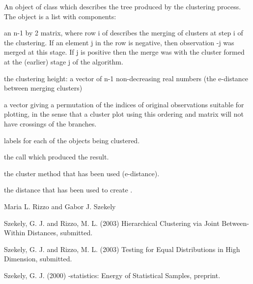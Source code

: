 \begin{Value}
An object of class  which describes the tree produced by
the clustering process. The object is a list with components: 
\begin{ldescription}
\item[\code{merge:}] an n-1 by 2 matrix, where row i of  describes the
merging of clusters at step i of the clustering. If an element j in the
row is negative, then observation -j was merged at this
stage. If j is positive then the merge was with the cluster
formed at the (earlier) stage j of the algorithm.
\item[\code{height:}] the clustering height: a vector of n-1 non-decreasing
real numbers (the e-distance between merging clusters)
\item[\code{order:}] a vector giving a permutation of the indices of 
original observations suitable for plotting, in the sense that a 
cluster plot using this ordering and matrix  will not have 
crossings of the branches.
\item[\code{labels:}] labels for each of the objects being clustered.
\item[\code{call:}] the call which produced the result.
\item[\code{method:}] the cluster method that has been used (e-distance).
\item[\code{dist.method:}] the distance that has been used to create .
\end{ldescription}
\end{Value}
\begin{Author}\relax
Maria L. Rizzo  and
Gabor J. Szekely 
\end{Author}
\begin{References}\relax
Szekely, G. J. and Rizzo, M. L. (2003) Hierarchical Clustering
via Joint Between-Within Distances, submitted.

Szekely, G. J. and Rizzo, M. L. (2003) Testing for Equal
Distributions in High Dimension, submitted.

Szekely, G. J. (2000) -statistics: Energy of
Statistical Samples, preprint.\end{References}
\begin{SeeAlso}\relax
{}  
\end{SeeAlso}
